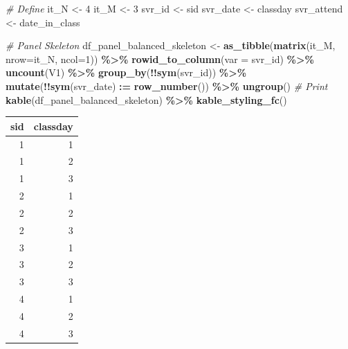 \documentclass[
]{book}
\newenvironment{Shaded}{\begin{snugshade}}{\end{snugshade}}
\newcommand{\CommentTok}[1]{\textcolor[rgb]{0.56,0.35,0.01}{\textit{#1}}}
\newcommand{\DataTypeTok}[1]{\textcolor[rgb]{0.13,0.29,0.53}{#1}}
\newcommand{\DecValTok}[1]{\textcolor[rgb]{0.00,0.00,0.81}{#1}}
\newcommand{\ErrorTok}[1]{\textcolor[rgb]{0.64,0.00,0.00}{\textbf{#1}}}
\newcommand{\KeywordTok}[1]{\textcolor[rgb]{0.13,0.29,0.53}{\textbf{#1}}}
\newcommand{\NormalTok}[1]{#1}
\newcommand{\OperatorTok}[1]{\textcolor[rgb]{0.81,0.36,0.00}{\textbf{#1}}}
\newcommand{\StringTok}[1]{\textcolor[rgb]{0.31,0.60,0.02}{#1}}
\begin{document}
\begin{Shaded}
\begin{Highlighting}[]
\CommentTok{\# Define}
\NormalTok{it\_N \textless{}{-}}\StringTok{ }\DecValTok{4}
\NormalTok{it\_M \textless{}{-}}\StringTok{ }\DecValTok{3}
\NormalTok{svr\_id \textless{}{-}}\StringTok{ \textquotesingle{}sid\textquotesingle{}}
\NormalTok{svr\_date \textless{}{-}}\StringTok{ \textquotesingle{}classday\textquotesingle{}}
\NormalTok{svr\_attend \textless{}{-}}\StringTok{ \textquotesingle{}date\_in\_class\textquotesingle{}}

\CommentTok{\# Panel Skeleton}
\NormalTok{df\_panel\_balanced\_skeleton \textless{}{-}}\StringTok{ }\KeywordTok{as\_tibble}\NormalTok{(}\KeywordTok{matrix}\NormalTok{(it\_M, }\DataTypeTok{nrow=}\NormalTok{it\_N, }\DataTypeTok{ncol=}\DecValTok{1}\NormalTok{)) }\OperatorTok{\%\textgreater{}\%}
\StringTok{  }\KeywordTok{rowid\_to\_column}\NormalTok{(}\DataTypeTok{var =}\NormalTok{ svr\_id) }\OperatorTok{\%\textgreater{}\%}
\StringTok{  }\KeywordTok{uncount}\NormalTok{(V1) }\OperatorTok{\%\textgreater{}\%}
\StringTok{  }\KeywordTok{group\_by}\NormalTok{(}\OperatorTok{!!}\KeywordTok{sym}\NormalTok{(svr\_id)) }\OperatorTok{\%\textgreater{}\%}\StringTok{ }\KeywordTok{mutate}\NormalTok{(}\OperatorTok{!!}\KeywordTok{sym}\NormalTok{(svr\_date) }\OperatorTok{:}\ErrorTok{=}\StringTok{ }\KeywordTok{row\_number}\NormalTok{()) }\OperatorTok{\%\textgreater{}\%}
\StringTok{  }\KeywordTok{ungroup}\NormalTok{()}
\CommentTok{\# Print}
\KeywordTok{kable}\NormalTok{(df\_panel\_balanced\_skeleton) }\OperatorTok{\%\textgreater{}\%}
\StringTok{  }\KeywordTok{kable\_styling\_fc}\NormalTok{()}
\end{Highlighting}
\end{Shaded}

\begin{table}[!h]
\centering
\begin{tabular}{r|r}
\hline
sid & classday\\
\hline
\rowcolor{gray!6}  1 & 1\\
\hline
1 & 2\\
\hline
\rowcolor{gray!6}  1 & 3\\
\hline
2 & 1\\
\hline
\rowcolor{gray!6}  2 & 2\\
\hline
2 & 3\\
\hline
\rowcolor{gray!6}  3 & 1\\
\hline
3 & 2\\
\hline
\rowcolor{gray!6}  3 & 3\\
\hline
4 & 1\\
\hline
\rowcolor{gray!6}  4 & 2\\
\hline
4 & 3\\
\hline
\end{tabular}
\end{table}
\end{document}

